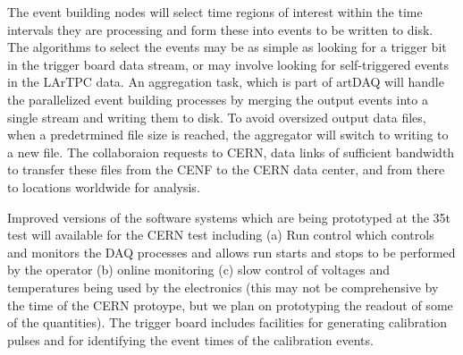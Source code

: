 The event building nodes will select time regions of interest within the time 
intervals they are processing and form these into events to be written to 
disk. The algorithms to select the events may be as simple as looking for 
a trigger bit in the trigger board data stream, or may involve looking 
for self-triggered events in the LArTPC data.  An aggregation task, which 
is part of artDAQ will handle the parallelized event building processes by 
merging the output events into a single stream and writing them to disk.
To avoid oversized output data files, when a predetrmined file size is reached, 
the aggregator will switch to writing to a new file.  The collaboraion 
requests to CERN, data links of sufficient bandwidth to transfer these files 
from the CENF to the CERN data center, and from there to locations 
worldwide for analysis. 

Improved versions of the software systems which are being prototyped at the 
35t test will available for the CERN test including (a) Run control which 
controls and monitors the DAQ processes and allows run starts and stops to
be performed by the operator (b) online monitoring (c) slow control of 
voltages and temperatures being used by the electronics (this may not be 
comprehensive by the time of the CERN protoype, but we plan on prototyping 
the readout of some of the quantities).  The trigger board includes facilities 
for generating calibration pulses and for identifying the event times of 
the calibration events.

